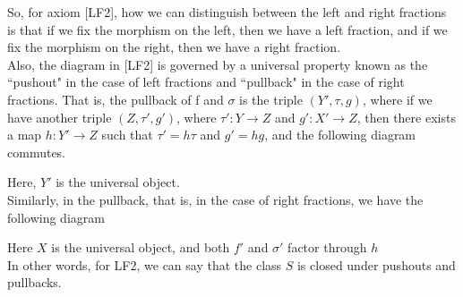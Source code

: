 \documentclass[12pt]{article}
\begin{document}
So, for axiom [LF2], how we can distinguish between the left and right fractions is that if we fix the morphism on the left, then we have a left fraction, and if we fix the morphism on the right, then we have a right fraction.\\
Also, the diagram in [LF2] is governed by a universal property known as the ``pushout" in the case of left fractions and ``pullback" in the case of right fractions. That is, the pullback of f and $\sigma$ is the triple $(Y',\tau,g)$, where if we have another triple $(Z,\tau',g')$, where $\tau':Y \to Z$ and $g':X' \to Z$, then there exists a map $h:Y' \to Z$ such that $\tau'=h\tau$ and $g'=hg$, and the following diagram commutes. 
\begin{center}
\end{center}
Here, $Y'$ is the universal object.\\

Similarly, in the pullback, that is, in the case of right fractions, we have the following diagram

\begin{center}
\end{center}
Here $X$ is the universal object, and both $f'$ and $\sigma'$ factor through $h$\\
In other words, for LF2, we can say that the class $S$ is closed under pushouts and pullbacks. \\
\end{document}
